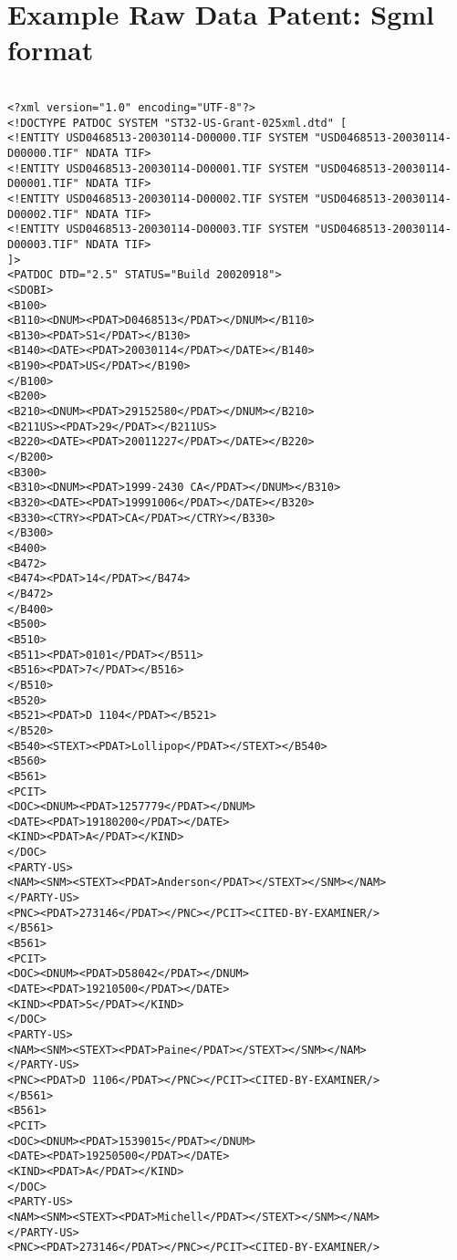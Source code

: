 
\chapter{Example Raw Data Patent: Sgml format} %

\label{AppendixC} %

\tiny
\begin{lstlisting}

<?xml version="1.0" encoding="UTF-8"?>
<!DOCTYPE PATDOC SYSTEM "ST32-US-Grant-025xml.dtd" [
<!ENTITY USD0468513-20030114-D00000.TIF SYSTEM "USD0468513-20030114-D00000.TIF" NDATA TIF>
<!ENTITY USD0468513-20030114-D00001.TIF SYSTEM "USD0468513-20030114-D00001.TIF" NDATA TIF>
<!ENTITY USD0468513-20030114-D00002.TIF SYSTEM "USD0468513-20030114-D00002.TIF" NDATA TIF>
<!ENTITY USD0468513-20030114-D00003.TIF SYSTEM "USD0468513-20030114-D00003.TIF" NDATA TIF>
]>
<PATDOC DTD="2.5" STATUS="Build 20020918">
<SDOBI>
<B100>
<B110><DNUM><PDAT>D0468513</PDAT></DNUM></B110>
<B130><PDAT>S1</PDAT></B130>
<B140><DATE><PDAT>20030114</PDAT></DATE></B140>
<B190><PDAT>US</PDAT></B190>
</B100>
<B200>
<B210><DNUM><PDAT>29152580</PDAT></DNUM></B210>
<B211US><PDAT>29</PDAT></B211US>
<B220><DATE><PDAT>20011227</PDAT></DATE></B220>
</B200>
<B300>
<B310><DNUM><PDAT>1999-2430 CA</PDAT></DNUM></B310>
<B320><DATE><PDAT>19991006</PDAT></DATE></B320>
<B330><CTRY><PDAT>CA</PDAT></CTRY></B330>
</B300>
<B400>
<B472>
<B474><PDAT>14</PDAT></B474>
</B472>
</B400>
<B500>
<B510>
<B511><PDAT>0101</PDAT></B511>
<B516><PDAT>7</PDAT></B516>
</B510>
<B520>
<B521><PDAT>D 1104</PDAT></B521>
</B520>
<B540><STEXT><PDAT>Lollipop</PDAT></STEXT></B540>
<B560>
<B561>
<PCIT>
<DOC><DNUM><PDAT>1257779</PDAT></DNUM>
<DATE><PDAT>19180200</PDAT></DATE>
<KIND><PDAT>A</PDAT></KIND>
</DOC>
<PARTY-US>
<NAM><SNM><STEXT><PDAT>Anderson</PDAT></STEXT></SNM></NAM>
</PARTY-US>
<PNC><PDAT>273146</PDAT></PNC></PCIT><CITED-BY-EXAMINER/>
</B561>
<B561>
<PCIT>
<DOC><DNUM><PDAT>D58042</PDAT></DNUM>
<DATE><PDAT>19210500</PDAT></DATE>
<KIND><PDAT>S</PDAT></KIND>
</DOC>
<PARTY-US>
<NAM><SNM><STEXT><PDAT>Paine</PDAT></STEXT></SNM></NAM>
</PARTY-US>
<PNC><PDAT>D 1106</PDAT></PNC></PCIT><CITED-BY-EXAMINER/>
</B561>
<B561>
<PCIT>
<DOC><DNUM><PDAT>1539015</PDAT></DNUM>
<DATE><PDAT>19250500</PDAT></DATE>
<KIND><PDAT>A</PDAT></KIND>
</DOC>
<PARTY-US>
<NAM><SNM><STEXT><PDAT>Michell</PDAT></STEXT></SNM></NAM>
</PARTY-US>
<PNC><PDAT>273146</PDAT></PNC></PCIT><CITED-BY-EXAMINER/>

\end{lstlisting}
